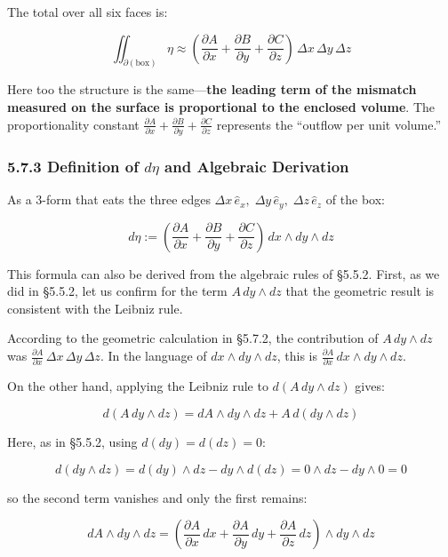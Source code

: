\documentclass[a4paper,12pt,openany]{book}
\begin{document}
The total over all six faces is:

\[\iint_{\partial (\text{box})} \eta \approx (\frac{\partial A}{\partial x} + \frac{\partial B}{\partial y} + \frac{\partial C}{\partial z})\,\Delta x\,\Delta y\,\Delta z\]

Here too the structure is the
same—\textbf{the leading term of the mismatch measured on the surface is proportional to the enclosed volume}.
The proportionality constant
\(\frac{\partial A}{\partial x} + \frac{\partial B}{\partial y} + \frac{\partial C}{\partial z}\)
represents the ``outflow per unit volume.''

\hypertarget{definition-of-deta-and-algebraic-derivation}{%
\subsubsection{\texorpdfstring{5.7.3 Definition of \(d\eta\) and
Algebraic
Derivation}{5.7.3 Definition of d\textbackslash eta and Algebraic Derivation}}\label{definition-of-deta-and-algebraic-derivation}}

As a \(3\)-form that eats the three edges
\(\Delta x\,\hat{e}_x,\; \Delta y\,\hat{e}_y,\; \Delta z\,\hat{e}_z\) of
the box:

\[d\eta := (\frac{\partial A}{\partial x} + \frac{\partial B}{\partial y} + \frac{\partial C}{\partial z})\,dx \wedge dy \wedge dz\]

This formula can also be derived from the algebraic rules of §5.5.2.
First, as we did in §5.5.2, let us confirm for the term
\(A\,dy \wedge dz\) that the geometric result is consistent with the
Leibniz rule.

According to the geometric calculation in §5.7.2, the contribution of
\(A\,dy \wedge dz\) was
\(\frac{\partial A}{\partial x}\,\Delta x\,\Delta y\,\Delta z\). In the
language of \(dx \wedge dy \wedge dz\), this is
\(\frac{\partial A}{\partial x}\,dx \wedge dy \wedge dz\).

On the other hand, applying the Leibniz rule to \(d(A\,dy \wedge dz)\)
gives:

\[d(A\,dy \wedge dz) = dA \wedge dy \wedge dz + A\,d(dy \wedge dz)\]

Here, as in §5.5.2, using \(d(dy)=d(dz)=0\):

\[d(dy \wedge dz) = d(dy) \wedge dz - dy \wedge d(dz) = 0 \wedge dz - dy \wedge 0 = 0\]

so the second term vanishes and only the first remains:

\[dA \wedge dy \wedge dz = (\frac{\partial A}{\partial x}\,dx + \frac{\partial A}{\partial y}\,dy + \frac{\partial A}{\partial z}\,dz) \wedge dy \wedge dz\]
\end{document}
